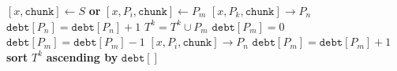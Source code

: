 \documentclass{article}
\begin{document}
\pagestyle{empty}

\newcommand{\send}{\Rightarrow}
\newcommand{\sendto}{\rightarrow}
\algrenewcommand{}

\begin{algorithmic}

  \State $[x,\mathtt{chunk}] \gets S$ \textbf{or} $[x,P_i,\mathtt{chunk}] \gets P_m$
  \State $[x,P_k,\mathtt{chunk}] \sendto P_n$
  \State $\mathtt{debt}[P_n] = \mathtt{debt}[P_n]+1$
  \EndFor
  \EndIf
  \State $T^k = T^k \cup P_m$
  \State $\mathtt{debt}[P_m]=0$
  \Else
  \State $\mathtt{debt}[P_m] = \mathtt{debt}[P_m]-1$
  \EndIf
  \State $[x,P_i,\mathtt{chunk}] \sendto P_n$
  \State $\mathtt{debt}[P_m] = \mathtt{debt}[P_m]+1$
  \EndFor
  \EndIf
  \State \textbf{sort} $T^k$ \textbf{ascending by} $\mathtt{debt[]}$
  \EndWhile
  \EndProcedure
  
\end{algorithmic}
\end{document}
